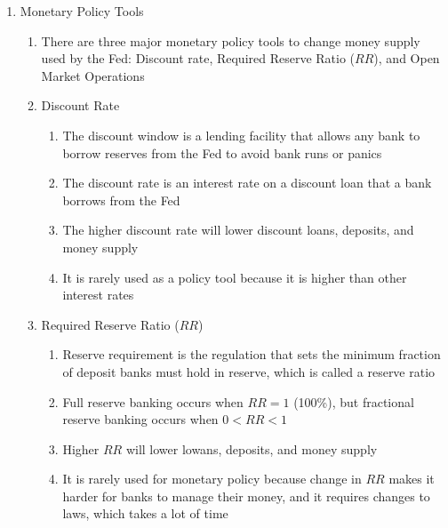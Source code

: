 \documentclass[12pt]{article}
\begin{document}
\begin{enumerate}
\begin{enumerate}
        \end{enumerate}

      \item Monetary Policy Tools

        \begin{enumerate}

          \item There are three major monetary policy tools to change money supply used by the Fed: Discount rate, Required Reserve Ratio ($RR$), and Open Market Operations

          \item Discount Rate

            \begin{enumerate}

              \item The discount window is a lending facility that allows any bank to borrow reserves from the Fed to avoid bank runs or panics

              \item The discount rate is an interest rate on a discount loan that a bank borrows from the Fed

              \item The higher discount rate will lower discount loans, deposits, and money supply

              \item It is rarely used as a policy tool because it is higher than other interest rates

            \end{enumerate}

          \item Required Reserve Ratio ($RR$)

            \begin{enumerate}

              \item Reserve requirement is the regulation that sets the minimum fraction of deposit banks must hold in reserve, which is called a reserve ratio

              \item Full reserve banking occurs when $RR=1$ (100\%), but fractional reserve banking occurs when $0<RR<1$

              \item Higher $RR$ will lower lowans, deposits, and money supply

              \item It is rarely used for monetary policy because change in $RR$ makes it harder for banks to manage their money, and it requires changes to laws, which takes a lot of time


\end{enumerate}
\end{enumerate}
\end{enumerate}
\end{document}

